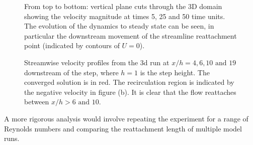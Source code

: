 \begin{figure}
\centering
{}
\caption{From top to bottom: vertical plane cuts through the 3D domain showing
the velocity magnitude at times 5, 25 and 50 time units.
The evolution of the dynamics to steady state can be seen, in particular the downstream movement
of the streamline reattachment point (indicated by contours of $U=0$).}
\label{fig:velo-magnitude-3d}
\end{figure}

\begin{figure}
\centering
{}
\caption{Streamwise velocity profiles from the 3d run at $x/h=4, 6, 10 \text{ and } 19$
downstream of the step, where $h=1$ is the step height. The converged solution is in red.
The recirculation region is indicated by the negative velocity in figure (b).
It is clear that the flow reattaches between $x/h>6 \text{ and } 10$.}
\label{fig:UProfiles3d}
\end{figure}






A more rigorous analysis would involve
repeating the experiment for a range of Reynolds numbers and comparing the reattachment
length of multiple model runs.


